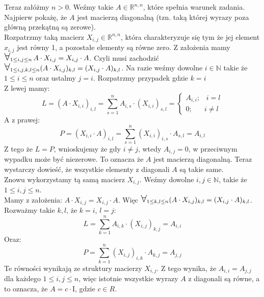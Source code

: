\documentclass[12pt]{article}
\newcommand{\R}{\mathbb{R}}
\newcommand{\N}{\mathbb{N}}
\newcommand{\Forall}{{\Large\mbox{$\forall$}}}
\begin{document}
Teraz załóżmy $n > 0$. Weźmy takie $A \in \R^{n,n}$, które spełnia warunek zadania. Najpierw pokażę, że $A$ jest macierzą diagonalną (tzn. taką której wyrazy poza główną przekątną są zerowe).\\
Rozpatrzmy taką macierz $X_{i,j} \in \R^{n,n}$, która charakteryzuje się tym że jej element $x_{i,j}$ jest równy 1, a pozostałe elementy są równe zero. Z założenia mamy $\Forall_{1 \leq i, j \leq n} \, A \cdot X_{i,j} = X_{i,j} \cdot A$. Czyli musi zachodzić $\Forall_{1 \leq i, j, k, l \leq n} (A \cdot X_{i,j})_{k, l} = (X_{i,j} \cdot A)_{k, l}$. Na razie weźmy dowolne $i \in \N$ takie że $1 \leq i \leq n$ oraz ustalmy $j = i$. Rozpatrzmy przypadek gdzie $k = i$  \\
Z lewej mamy:
$$L = (A \cdot X_{i, i})_{i, l} = \sum_{s = 1}^n A_{i, s} \cdot (X_{i, i})_{s, l} = 
\begin{cases}
    A_{i, i}; \hspace{10pt} i = l \\
    0; \hspace{20pt} i \neq l
\end{cases}$$
A z prawej:
$$P = (X_{i, i} \cdot A)_{i, l} = \sum_{s = 1}^n (X_{i, i})_{i, s} \cdot A_{s, l} = A_{i, l}
$$
Z tego że $L = P$, wnioskujemy że gdy $i \neq j$, wtedy $A_{i, j} = 0$, w przeciwnym wypadku może być niezerowe. To oznacza że $A$ jest macierzą diagonalną.
Teraz wystarczy dowieść, że wszystkie elementy z diagonali $A$ są takie same. \\[5pt]
Znowu wykorzystamy tą samą macierz $X_{i, j}$. Weźmy dowolne $i, j \in \N$, takie że $1 \leq i, j \leq n$. \\
Mamy z założenia: $A \cdot X_{i, j} = X_{i, j} \cdot A$. Więc $\Forall_{1 \leq k, l \leq n} (A \cdot X_{i, j})_{k, l} = (X_{i, j} \cdot A)_{k, l}$. Rozważmy takie $k, l$, że $k = i$, $l = j$:
$$L = \sum_{k = 1}^n A_{i, k} \cdot (X_{i, j})_{k, j} = A_{i, i}$$
Oraz:
$$P = \sum_{k = 1}^n (X_{i,j})_{i, k} \cdot A_{k, j} = A_{j, j}$$
Te równości wynikają ze struktury macierzy $X_{i, j}$. Z tego wynika, że $A_{i, i} = A_{j, j}$ dla każdego $1 \leq i, j \leq n$, więc istotnie wszystkie wyrazy $A$ z diagonali są równe, a to oznacza, że $A = c \cdot \mathrm{I}$, gdzie $c \in R$.
\end{document}
